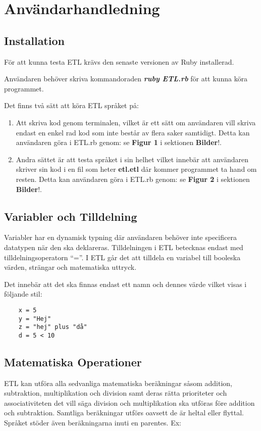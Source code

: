 \documentclass{TDP019mall}
\begin{document}
\section{Användarhandledning}

\subsection{Installation}
För att kunna testa ETL krävs den senaste versionen av Ruby installerad. 

Användaren behöver skriva kommandoraden \textbf{\textit{ruby ETL.rb}} för att kunna köra programmet.

Det finns två sätt att köra ETL språket på:
\begin{enumerate}
    \item Att skriva kod genom terminalen, vilket är ett sätt om användaren vill skriva endast en enkel rad kod som inte består av flera saker samtidigt.
    Detta kan användaren göra i ETL.rb genom: se \textbf{Figur 1} i sektionen \textbf{Bilder}!.
    \item Andra sättet är att testa språket i sin helhet vilket innebär att användaren skriver sin kod i en fil som heter \textbf{etl.etl} där kommer 
    programmet ta hand om resten. Detta kan användaren göra i ETL.rb genom: se \textbf{Figur 2} i sektionen \textbf{Bilder}!.     
\end{enumerate}  

\newpage
\subsection{Variabler och Tilldelning}
Variabler har en dynamisk typning där användaren behöver inte specificera datatypen när den ska deklareras. Tilldelningen i ETL betecknas endast med 
tilldelningsoperatorn “=”. I ETL går det att tilldela en variabel till booleska värden, strängar och matematiska uttryck.

Det innebär att det ska finnas endast ett namn och dennes värde vilket visas i följande stil:
\begin{verbatim}
    x = 5 
    y = "Hej"
    z = "hej" plus "då"
    d = 5 < 10
\end{verbatim}


\subsection{Matematiska Operationer}
ETL kan utföra alla sedvanliga matematiska beräkningar såsom addition, subtraktion, multiplikation och division samt deras rätta prioriteter 
och associativiteten det vill säga division och multiplikation ska utföras före addition och subtraktion. Samtliga beräkningar utförs oavsett 
de är heltal eller flyttal. Språket stöder även beräkningarna inuti en parentes. Ex:
\end{document}
